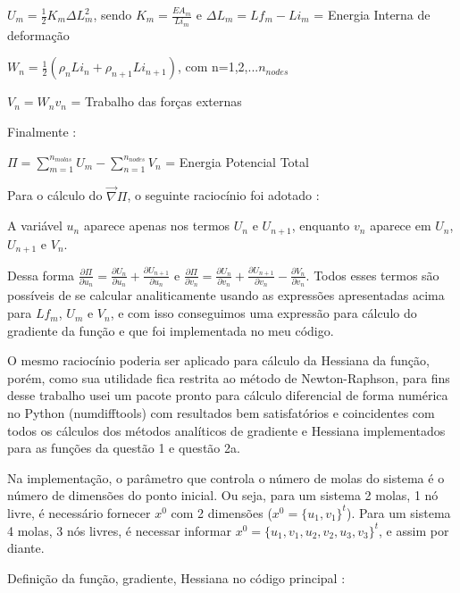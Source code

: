 \documentclass[10pt, a4paper]{article}
\begin{document}
\vspace{3mm}
$U_m = \frac{1}{2}K_m\Delta L_m^2$, sendo $K_m = \frac{EA_m}{Li_m}$ e $\Delta L_m = Lf_m - Li_m$ = Energia Interna de deformação

\vspace{3mm}
$W_n = \frac{1}{2}(\rho_n Li_n + \rho_{n+1} Li_{n+1})$, com n=1,2,...$n_{nodes}$

\vspace{3mm}
$V_n = W_nv_n$ = Trabalho das forças externas

\vspace{3mm}
Finalmente :

\vspace{3mm}
$\Pi = \sum_{m=1}^{n_{molas}}{U_m} - \sum_{n=1}^{n_{nodes}}{V_n}$ = Energia Potencial Total

\vspace{3mm}
Para o cálculo do $\overrightarrow{\nabla} \Pi$, o seguinte raciocínio foi adotado :

A variável $u_n$ aparece apenas nos termos $U_n$ e $U_{n+1}$, enquanto $v_n$ aparece em $U_n$, $U_{n+1}$ e $V_n$.

Dessa forma $\frac{\partial \Pi}{\partial u_n} = \frac{\partial U_n}{\partial u_n} + \frac{\partial U_{n+1}}{\partial u_n}$ e 
$\frac{\partial \Pi}{\partial v_n} = \frac{\partial U_n}{\partial v_n} + \frac{\partial U_{n+1}}{\partial v_n} -
\frac{\partial V_n}{\partial v_n} $. Todos esses termos são possíveis de se calcular analiticamente usando as expressões
apresentadas acima para $Lf_m$, $U_m$ e $V_n$, e com isso conseguimos uma expressão para cálculo do gradiente da função e que
foi implementada no meu código.

O mesmo raciocínio poderia ser aplicado para cálculo da Hessiana da função, porém, como sua utilidade fica restrita ao
método de Newton-Raphson, para fins desse trabalho usei um pacote pronto para cálculo diferencial de forma numérica no Python 
(numdifftools) com resultados bem satisfatórios e coincidentes com todos os cálculos dos métodos
analíticos de gradiente e Hessiana implementados para as funções da questão 1 e questão 2a.

Na implementação, o parâmetro que controla o número de molas do sistema é o número de dimensões do ponto inicial. Ou seja,
para um sistema 2 molas, 1 nó livre, é necessário fornecer $x^0$ com 2 dimensões ($x^0 = \{u_1, v_1\}^t$). Para um
sistema 4 molas, 3 nós livres, é necessar informar $x^0 = \{u_1, v_1, u_2, v_2, u_3, v_3\}^t$, e assim por diante.

\vspace{5mm}
Definição da função, gradiente, Hessiana no código principal :
\end{document}
